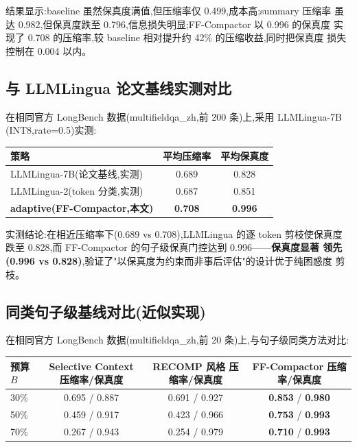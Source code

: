 \documentclass[11pt,a4paper]{article}
\begin{document}
结果显示:baseline 虽然保真度满值,但压缩率仅 0.499,成本高;summary 压缩率
虽达 0.982,但保真度跌至 0.796,信息损失明显;FF-Compactor 以 0.996 的保真度
实现了 0.708 的压缩率,较 baseline 相对提升约 42\% 的压缩收益,同时把保真度
损失控制在 0.004 以内。

\subsection{与 LLMLingua 论文基线实测对比}

在相同官方 LongBench 数据(multifieldqa\_zh,前 200 条)上,采用 LLMLingua-7B
(INT8,rate=0.5)实测:

\begin{table}[h]
  \centering
  \begin{tabular}{@{}lcc@{}}
    \toprule
    策略 & 平均压缩率 & 平均保真度 \\
    \midrule
    LLMLingua-7B(论文基线,实测) & 0.689 & 0.828 \\
    LLMLingua-2(token 分类,实测) & 0.687 & 0.851 \\
    \textbf{adaptive(FF-Compactor,本文)} & \textbf{0.708} & \textbf{0.996} \\
    \bottomrule
  \end{tabular}
\end{table}

实测结论:在相近压缩率下(0.689 vs 0.708),LLMLingua 的逐 token 剪枝使保真度
跌至 0.828,而 FF-Compactor 的句子级保真门控达到 0.996——\textbf{保真度显著
领先(0.996 vs 0.828)},验证了"以保真度为约束而非事后评估"的设计优于纯困惑度
剪枝。

\subsection{同类句子级基线对比(近似实现)}

在相同官方 LongBench 数据(multifieldqa\_zh,前 20 条)上,与句子级同类方法对比:

\begin{table}[h]
  \centering
  \begin{tabular}{@{}lccc@{}}
    \toprule
    预算 $B$ & Selective Context 压缩率/保真度 & RECOMP 风格 压缩率/保真度 & FF-Compactor 压缩率/保真度 \\
    \midrule
    30\% & 0.695 / 0.887 & 0.691 / 0.927 & \textbf{0.853} / \textbf{0.980} \\
    50\% & 0.459 / 0.917 & 0.423 / 0.966 & \textbf{0.753} / \textbf{0.993} \\
    70\% & 0.267 / 0.943 & 0.254 / 0.979 & \textbf{0.710} / \textbf{0.993} \\
    \bottomrule
  \end{tabular}
\end{table}
\end{document}
